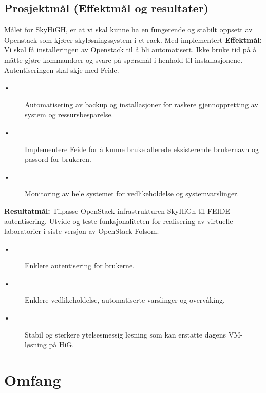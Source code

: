 \documentclass[12pt,a4paper]{article}
\newcommand{\tab}{\hspace*{2em}}
\begin{document}
\subsection{Prosjektmål (Effektmål og resultater)}
Målet for SkyHiGH, er at vi skal kunne ha en fungerende og stabilt oppsett av Openstack som kjører skyløsningssystem i et rack. Med implementert \newline \newline
\textbf{Effektmål:}\newline
Vi skal få installeringen av Openstack til å bli automatisert. Ikke bruke tid på å måtte gjøre kommandoer og svare på spørsmål i henhold til installasjonene. Autentiseringen skal skje med Feide.
\begin{description}
	\item[\tab •] Automatisering av backup og installasjoner for raskere gjennoppretting av system og ressursbesparelse. 
	\item[\tab •] Implementere Feide for å kunne bruke allerede eksisterende brukernavn og passord for brukeren.
	\item[\tab •] Monitoring av hele systemet for vedlikeholdelse og systemvarslinger.
\end{description}
\textbf{Resultatmål:}\newline
Tilpasse OpenStack-infrastrukturen SkyHiGh til FEIDE-autentisering. Utvide og teste
funksjonaliteten for realisering av virtuelle laboratorier i siste versjon av OpenStack Folsom.
\begin{description}
	\item[\tab •] Enklere autentisering for brukerne.
	\item[\tab •] Enklere vedlikeholdelse, automatiserte varslinger og overvåking.
	\item[\tab •] Stabil og sterkere ytelsesmessig løsning som kan erstatte dagens VM-løsning på HiG.
\end{description}

\section{Omfang}
\end{document}

